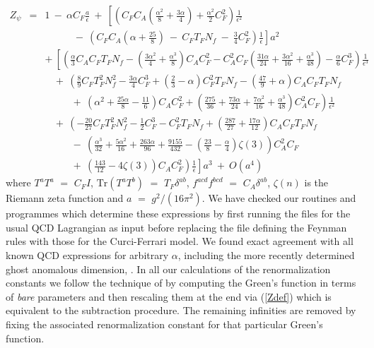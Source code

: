 \documentclass[a4paper,11pt]{article}
\newcommand{\Nf}{N_{\!f}}
\begin{document}
\begin{eqnarray} 
Z_\psi &=& 1 ~-~ \alpha C_F \frac{a}{\epsilon} ~+~ \left[ \left( C_F C_A  
\left( \frac{\alpha^2}{8} + \frac{3\alpha}{4} \right) + \frac{\alpha^2}{2} 
C_F^2 \right) \frac{1}{\epsilon^2} \right. \nonumber \\ 
&& \left. ~~~~~~~~~~~~~-~ \left( C_F C_A \left( \alpha + \frac{25}{8} 
\right) ~-~ C_F T_F \Nf ~-~ \frac{3}{4} C_F^2 \right) \frac{1}{\epsilon} 
\right] a^2 \nonumber \\ 
&& +~ \left[ \left( \frac{\alpha}{3} C_A C_F T_F \Nf 
- \left( \frac{3\alpha^2}{4} + \frac{\alpha^3}{8} \right) C_A C_F^2 
- C_A^2 C_F \left( \frac{31\alpha}{24} + \frac{3\alpha^2}{16} 
+ \frac{\alpha^3}{48} \right) - \frac{\alpha}{6} C_F^3 \right) 
\frac{1}{\epsilon^3} \right. \nonumber \\ 
&& \left. ~~~~+~ \left( \frac{8}{9} C_F T_F^2 \Nf^2 - \frac{3\alpha}{4} C_F^3 
+ \left( \frac{2}{3} - \alpha \right) C_F^2 T_F \Nf 
- \left( \frac{47}{9} + \alpha \right) C_A C_F T_F \Nf \right. \right. 
\nonumber \\
&& \left. \left. ~~~~~~~~~~~~+~ \left( \alpha^2 + \frac{25\alpha}{8} 
- \frac{11}{6} \right) C_A C_F^2 + \left( \frac{275}{36} + \frac{73\alpha}{24}
+ \frac{7\alpha^2}{16} + \frac{\alpha^3}{48} \right) C_A^2 C_F \right) 
\frac{1}{\epsilon^2} \right.  \nonumber \\  
&& \left. ~~~~+~ \left( - \frac{20}{27} C_F T_F^2 \Nf^2 
- \frac{1}{2} C_F^3 - C_F^2 T_F \Nf + \left( \frac{287}{27} 
+ \frac{17\alpha}{12} \right) C_A C_F T_F \Nf \right. \right. \nonumber \\
&& \left. \left. ~~~~~~~~~~~~-~ \left( \frac{\alpha^3}{32} 
+ \frac{5\alpha^2}{16} + \frac{263\alpha}{96} + \frac{9155}{432} 
- \left( \frac{23}{8} - \frac{\alpha}{4} \right) \zeta(3) \right) C_A^2 C_F 
\right. \right. \nonumber \\
&& \left. \left. ~~~~~~~~~~~~+~ \left( \frac{143}{12} - 4 \zeta(3) \right) 
C_A C_F^2 \right) \frac{1}{\epsilon} \right] a^3 ~+~ O(a^4) 
\label{Zwfs} 
\end{eqnarray} 
where $T^a T^a$ $=$ $C_F I$, $\mbox{Tr} \left( T^a T^b \right)$ $=$ $T_F
\delta^{ab}$, $f^{acd} f^{bcd}$ $=$ $C_A \delta^{ab}$, $\zeta(n)$ is the
Riemann zeta function and $a$ $=$ $g^2/(16\pi^2)$. We have checked our routines
and programmes which determine these expressions by first running the files for
the usual QCD Lagrangian as input before replacing the file defining the 
Feynman rules with those for the Curci-Ferrari model. We found exact agreement 
with all known QCD expressions for arbitrary $\alpha$, including the more 
recently determined ghost anomalous dimension, \cite{36,37,38,39,40}. In all 
our calculations of the renormalization constants we follow the technique of 
\cite{39} by computing the Green's function in terms of {\em bare} parameters 
and then rescaling them at the end via (\ref{Zdef}) which is equivalent to the
subtraction procedure. The remaining infinities are removed by fixing the 
associated renormalization constant for that particular Green's function.  
\end{document}
